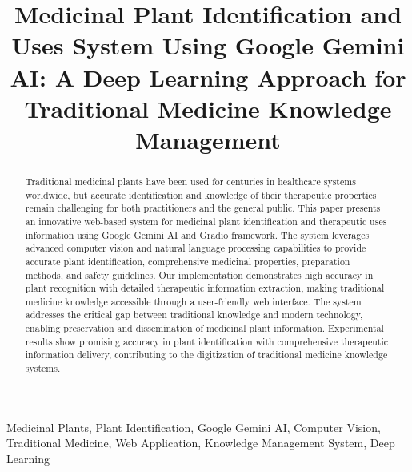 \documentclass[conference]{IEEEtran}
\begin{document}
\title{Medicinal Plant Identification and Uses System Using Google Gemini AI: A Deep Learning Approach for Traditional Medicine Knowledge Management}

\author{
\and
{}
}

\maketitle

\begin{abstract}
Traditional medicinal plants have been used for centuries in healthcare systems worldwide, but accurate identification and knowledge of their therapeutic properties remain challenging for both practitioners and the general public. This paper presents an innovative web-based system for medicinal plant identification and therapeutic uses information using Google Gemini AI and Gradio framework. The system leverages advanced computer vision and natural language processing capabilities to provide accurate plant identification, comprehensive medicinal properties, preparation methods, and safety guidelines. Our implementation demonstrates high accuracy in plant recognition with detailed therapeutic information extraction, making traditional medicine knowledge accessible through a user-friendly web interface. The system addresses the critical gap between traditional knowledge and modern technology, enabling preservation and dissemination of medicinal plant information. Experimental results show promising accuracy in plant identification with comprehensive therapeutic information delivery, contributing to the digitization of traditional medicine knowledge systems.
\end{abstract}

\begin{IEEEkeywords}
Medicinal Plants, Plant Identification, Google Gemini AI, Computer Vision, Traditional Medicine, Web Application, Knowledge Management System, Deep Learning
\end{IEEEkeywords}
\end{document}
